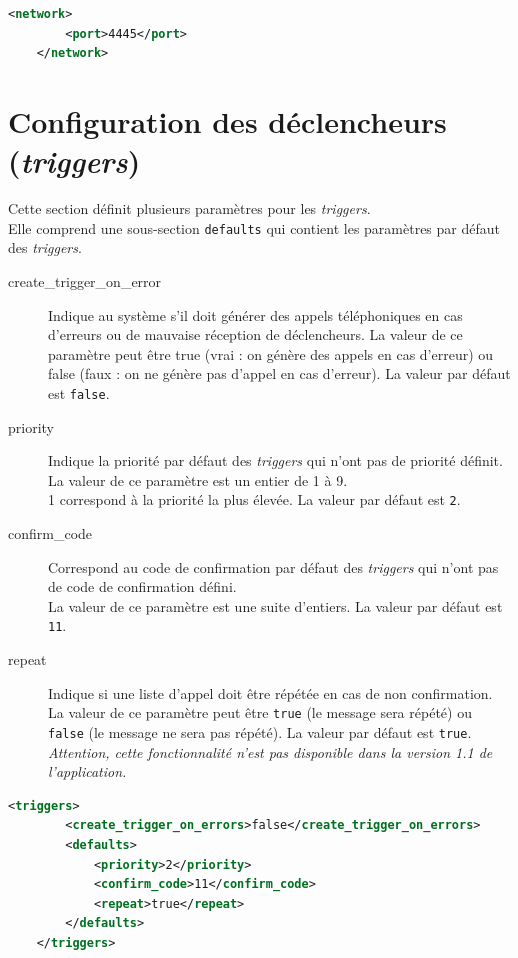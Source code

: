 \documentclass{article}
\begin{document}
\begin{lstlisting}[language=xml,name=Aperçu de la section network]
    <network>
        <port>4445</port>
    </network>
\end{lstlisting}


\pagebreak
\section{Configuration des déclencheurs (\emph{triggers})}

Cette section définit plusieurs paramètres pour les \emph{triggers}. \\
Elle comprend une sous-section \texttt{defaults} qui contient les paramètres par défaut des \emph{triggers}.

\begin{description}
    \item[create\_trigger\_on\_error] Indique au système s'il doit générer des appels téléphoniques en cas d'erreurs ou de mauvaise réception de déclencheurs. La valeur de ce paramètre peut être true (vrai : on génère des appels en cas d'erreur) ou false (faux : on ne génère pas d'appel en cas d'erreur). La valeur par défaut est \texttt{false}. 
    \item[priority] Indique la priorité par défaut des \emph{triggers} qui n'ont pas de priorité définit. La valeur de ce paramètre est un entier de 1 à 9. \\
    1 correspond à la priorité la plus élevée. La valeur par défaut est  \texttt{2}.
    \item[confirm\_code] Correspond au code de confirmation par défaut des \emph{triggers} qui n'ont pas de code de confirmation défini.\\
    La valeur de ce paramètre est une suite d'entiers. La valeur par défaut est  \texttt{11}.
    \item[repeat] Indique si une liste d'appel doit être répétée en cas de non confirmation. La valeur de ce paramètre peut être \texttt{true} (le message sera répété) ou \texttt{false} (le message ne sera pas répété). La valeur par défaut est \texttt{true}. \\\emph{Attention, cette fonctionnalité n'est pas disponible dans la version 1.1 de l'application.}
\end{description}

\begin{lstlisting}[language=xml,name=Aperçu de la section triggers]
    <triggers>
        <create_trigger_on_errors>false</create_trigger_on_errors>
        <defaults>
            <priority>2</priority>
            <confirm_code>11</confirm_code>
            <repeat>true</repeat>
        </defaults>
    </triggers>
\end{lstlisting}
\end{document}
